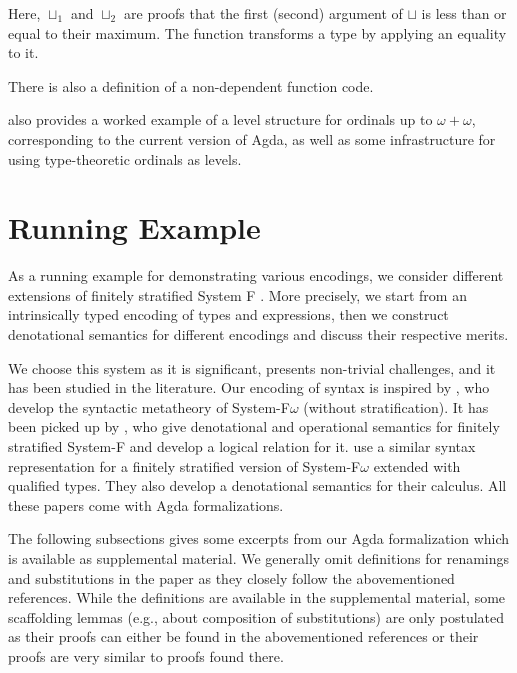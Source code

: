\documentclass[manuscript,screen,review,anonymous]{acmart}
\begin{document}
{Here, $\sqcup_1$ and $\sqcup_2$ are proofs that the first (second)
argument of $\sqcup$ is less than or equal to their maximum. The
function {\Acoe} transforms a type by applying an equality to it.

There is also a definition of a non-dependent function code.

\UFun

\citet{DBLP:conf/csl/Kovacs22} also provides a worked example of a
level structure for ordinals up to $\omega+\omega$, corresponding to
the current version of Agda, as well as some infrastructure for
using type-theoretic ordinals as levels.

\section{Running Example}
\label{sec:running-example}

As a running example for demonstrating various encodings, we consider
different extensions of finitely stratified System F
\cite{DBLP:journals/iandc/Leivant91}. More precisely, we start from an
intrinsically typed encoding of types and expressions, then we
construct denotational semantics for different encodings and discuss
their respective merits.

We choose this system as it is significant, presents non-trivial
challenges, and it has been studied in the literature. Our encoding of
syntax is inspired by \citet{DBLP:conf/mpc/ChapmanKNW19}, who develop
the syntactic metatheory of System-F$\omega$ (without
stratification). It has been  picked up by
\citet{DBLP:conf/tyde/Saffrich0W24}, who give denotational and operational semantics
for finitely stratified System-F and develop a logical relation for
it. \citet{DBLP:journals/pacmpl/HubersM23} use a similar syntax
representation for a finitely stratified version of System-F$\omega$
extended with qualified types. They also develop a denotational
semantics for their calculus. All these papers come with Agda
formalizations. 

The following subsections gives some excerpts from our Agda
formalization which is available as supplemental material. We
generally omit definitions for renamings and substitutions in the
paper as they closely follow the abovementioned references. While the
definitions are available in the supplemental material, some
scaffolding lemmas (e.g., about composition of substitutions) are only
postulated as their proofs can either be found in the abovementioned
references or their proofs are very similar to proofs found there. 

}
\end{document}
